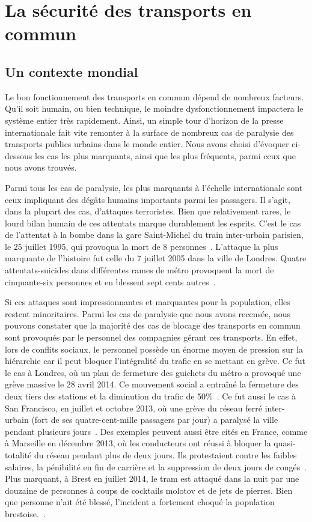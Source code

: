 \section{La sécurité des transports en commun}
    \subsection{Un contexte mondial}
        Le bon fonctionnement des transports en commun dépend de nombreux facteurs. Qu'il soit humain, ou bien technique, le moindre dysfonctionnement impactera le système entier très rapidement. Ainsi, un simple tour d'horizon de la presse internationale fait vite remonter à la surface de nombreux cas de paralysie des transports publics urbains dans le monde entier. Nous avons choisi d'évoquer ci-dessous les cas les plus marquants, ainsi que les plus fréquents, parmi ceux que nous avons trouvés. 
             
        Parmi tous les cas de paralysie, les plus marquants à l'échelle internationale sont ceux impliquant des dégâts humains importants parmi les passagers. Il s'agit, dans la plupart des cas, d'attaques terroristes. Bien que relativement rares, le lourd bilan humain de ces attentats marque durablement les esprits.  C'est le cas de l'attentat à la bombe dans la gare Saint-Michel du train inter-urbain parisien, le 25 juillet 1995, qui provoqua la mort de 8 personnes~\cite{stmichel}. L'attaque la plus marquante de l'histoire fut celle du 7 juillet 2005 dans la ville de Londres. Quatre attentats-suicides dans différentes rames de métro provoquent la mort de cinquante-six personnes et en blessent sept cents autres~\cite{london_attacks}.
        
        Si ces attaques sont impressionnantes et marquantes pour la population, elles restent minoritaires. Parmi les cas de paralysie que nous avons recensée, nous pouvons constater que la majorité des cas de blocage des transports en commun sont provoqués par le personnel des compagnies gérant ces transports. En effet, lors de conflits sociaux, le personnel possède un énorme moyen de pression sur la hiérarchie car il peut bloquer l'intégralité du trafic en se mettant en grève.  Ce fut le cas à Londres, où un plan de fermeture des guichets du métro a provoqué une grève massive le 28 avril 2014. Ce mouvement social a entraîné la fermeture des deux tiers des stations et la diminution du trafic de 50\%~\cite{tubeApril}. Ce fut aussi le cas à San Francisco, en juillet et octobre 2013, où une grève du réseau ferré inter-urbain (fort de ses quatre-cent-mille passagers par jour) a paralysé la ville pendant plusieurs jours~\cite{SFbart}. Des exemples peuvent aussi être cités en France, comme à Marseille en décembre 2013, où les conducteurs ont réussi à bloquer la quasi-totalité du réseau pendant plus de deux jours. Ils protestaient contre les faibles salaires, la pénibilité en fin de carrière et la suppression de deux jours de congés~\cite{greve_marseille}. Plus marquant, à Brest en juillet 2014, le tram est attaqué dans la  nuit par une douzaine de personnes à coups de cocktails molotov et de jets de pierres. Bien que personne n'ait été blessé, l'incident a fortement choqué la population brestoise.~\cite{molotov}.
            
